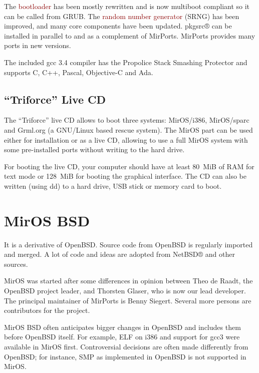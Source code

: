 \documentclass[a4paper,landscape,11pt,notumble]{leaflet}
\begin{document}
The \textcolor{darkred}{bootloader} has been mostly rewritten and is now multiboot compliant so it can be called from GRUB.  The \textcolor{darkred}{random number generator} (SRNG) has been improved, and many core components have been updated. pkgsrc® can be installed in parallel to and as a complement of MirPorts. MirPorts provides many ports in new versions.

The included gcc 3.4 compiler has the Propolice Stack Smashing Protector and supports C, C++, Pascal,  Objective-C and Ada.


\subsection{``Triforce'' Live CD}

The ``Triforce'' live CD allows to boot three systems: MirOS/i386, MirOS/sparc and Grml.org (a GNU/Linux based rescue system). The MirOS part can be used either for installation or as a live CD, allowing to use a full MirOS system with some pre-installed ports without writing to the hard drive.

For booting the live CD, your computer should have at least 80~MiB of RAM for text mode or 128~MiB for booting the graphical interface. The CD can also be written (using dd) to a hard drive, USB stick or memory card to boot.


\newpage

\section{MirOS BSD}


It is a derivative of OpenBSD. Source code from OpenBSD is regularly imported and merged. A lot of code and ideas are adopted from NetBSD® and other sources.

MirOS was started after some differences in opinion between Theo de Raadt, the OpenBSD project leader, and Thorsten Glaser, who is now our lead developer. The principal maintainer of MirPorts is Benny Siegert. Several more persons are contributors for the project.

MirOS BSD often anticipates bigger changes in OpenBSD and includes them before OpenBSD itself. For example, ELF on i386 and support for gcc3 were available in MirOS first. Controversial decisions are often made differently from OpenBSD; for instance, SMP as implemented in OpenBSD is not supported in MirOS.
\end{document}
